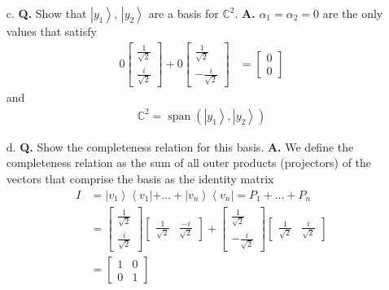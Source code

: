 \documentclass[main.tex]{subfiles}
\begin{document}
\begin{enumerate}
\begin{enumerate}
        \item[c.] \textbf{Q.} Show that $\left|y_{1}\right\rangle$, $\left|y_{2}\right\rangle$ are a basis for $\mathbb{C}^{2}$. \textbf{A.} $\alpha_1=\alpha_2=0$ are the only values that satisfy
        \begin{align*}
            0 \left[\begin{array}{l} \frac{1}{\sqrt{2}} \\ \frac{i}{\sqrt{2}} \end{array}\right]  
            + 0 \left[\begin{array}{l} \frac{1}{\sqrt{2}} \\ -\frac{i}{\sqrt{2}} \end{array}\right]  & = \left[\begin{array}{l} 0 \\ 0 \end{array}\right]
        \end{align*}
        and
        \begin{align*}
            \mathbb{C}^2 = \operatorname{span} \left( \left|y_{1} \right\rangle, \left|y_{2}\right\rangle \right)  
        \end{align*}
        
        \item[d.] \textbf{Q.} Show the completeness relation for this basis. \textbf{A.} We define the completeness relation as the sum of all outer products (projectors) of the vectors that comprise the basis as the identity matrix  
        \begin{align*}
            I   & = \left|v_{1}\right\rangle\left\langle v_{1}|+\ldots+| v_{n}\right\rangle\left\langle v_{n}\right|= P_{1}+\ldots+P_{n}\\
                & = \left[\begin{array}{l} \frac{1}{\sqrt{2}} \\ \frac{i}{\sqrt{2}} \end{array}\right] 
                    \left[\begin{array}{ll} \frac{1}{\sqrt{2}} & \frac{-i}{\sqrt{2}} \end{array}\right]
                    + \left[\begin{array}{l} \frac{1}{\sqrt{2}} \\ -\frac{i}{\sqrt{2}} \end{array}\right]
                    \left[\begin{array}{ll} \frac{1}{\sqrt{2}} & \frac{i}{\sqrt{2}} \end{array}\right] \\
                & = \left[\begin{array}{ll} 1 & 0 \\ 0 & 1 \end{array}\right]
        \end{align*}
        

\end{enumerate}
\end{enumerate}
\end{document}

